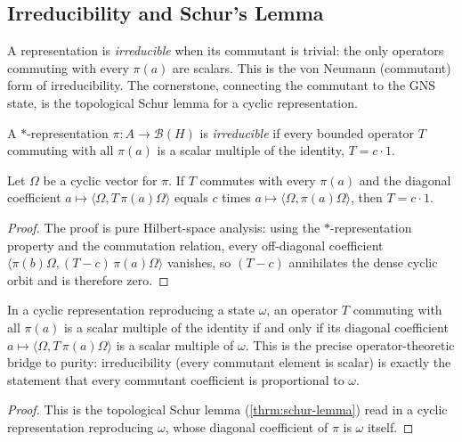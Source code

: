 \subsection{Irreducibility and Schur's Lemma}

A representation is \emph{irreducible} when its commutant is trivial: the only operators commuting with every $\pi(a)$ are scalars. This is the von Neumann (commutant) form of irreducibility. The cornerstone, connecting the commutant to the GNS state, is the topological Schur lemma for a cyclic representation.

\begin{definition}
    \label{def:irreducible-representation}
    \leanok
    A $*$-representation $\pi : A \to \mathcal{B}(H)$ is \emph{irreducible} if every bounded operator $T$ commuting with all $\pi(a)$ is a scalar multiple of the identity, $T = c \cdot 1$.
\end{definition}

\begin{theorem}
    \label{thrm:schur-lemma}
    \leanok
    Let $\Omega$ be a cyclic vector for $\pi$. If $T$ commutes with every $\pi(a)$ and the diagonal coefficient $a \mapsto \langle \Omega, T\,\pi(a)\Omega\rangle$ equals $c$ times $a \mapsto \langle \Omega, \pi(a)\Omega\rangle$, then $T = c \cdot 1$.
\end{theorem}
\begin{proof}
    \leanok
    The proof is pure Hilbert-space analysis: using the $*$-representation property and the commutation relation, every off-diagonal coefficient $\langle \pi(b)\Omega, (T - c)\,\pi(a)\Omega\rangle$ vanishes, so $(T - c)$ annihilates the dense cyclic orbit and is therefore zero.
\end{proof}

\begin{theorem}
    \label{thrm:commutant-scalar-iff}
    \leanok
    In a cyclic representation reproducing a state $\omega$, an operator $T$ commuting with all $\pi(a)$ is a scalar multiple of the identity if and only if its diagonal coefficient $a \mapsto \langle \Omega, T\,\pi(a)\Omega\rangle$ is a scalar multiple of $\omega$. This is the precise operator-theoretic bridge to purity: irreducibility (every commutant element is scalar) is exactly the statement that every commutant coefficient is proportional to $\omega$.
\end{theorem}
\begin{proof}
    \leanok
    This is the topological Schur lemma (\ref{thrm:schur-lemma}) read in a cyclic representation reproducing $\omega$, whose diagonal coefficient of $\pi$ is $\omega$ itself.
\end{proof}

